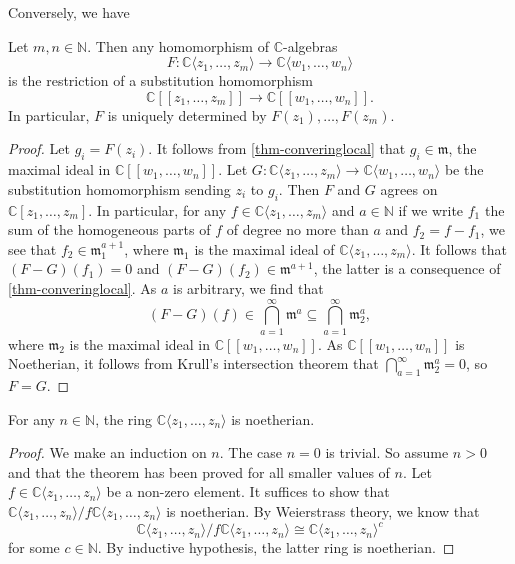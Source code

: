 Conversely, we have
\begin{lemma}\label{lma-homopowerringanalytic}
    Let $m,n\in \mathbb{N}$. Then any homomorphism of $\mathbb{C}$-algebras 
    \[
        F:  \mathbb{C}\langle z_1,\ldots,z_m\rangle\rightarrow  \mathbb{C}\langle w_1,\ldots,w_n\rangle
    \]
    is the restriction of a substitution homomorphism
    \[
        \mathbb{C}[[z_1,\ldots,z_m]]\rightarrow  \mathbb{C} [[ w_1,\ldots,w_n]].
    \]
    In particular, $F$ is uniquely determined by $F(z_1),\ldots,F(z_m)$.  
\end{lemma}
\begin{proof}
    Let $g_i=F(z_i)$. It follows from \cref{thm-converinglocal} that $g_i\in \mathfrak{m}$, the maximal ideal in $\mathbb{C} [[ w_1,\ldots,w_n]]$. Let $G:\mathbb{C}\langle z_1,\ldots,z_m\rangle\rightarrow  \mathbb{C}\langle w_1,\ldots,w_n\rangle$ be the substitution homomorphism sending $z_i$ to $g_i$. Then $F$ and $G$ agrees on $\mathbb{C}[z_1,\ldots,z_m]$. In particular, for any $f\in \mathbb{C}\langle z_1,\ldots,z_m\rangle$ and $a\in \mathbb{N}$ if we write $f_1$ the sum of the homogeneous parts of $f$ of degree no more than $a$ and $f_2=f-f_1$, we see that $f_2\in \mathfrak{m}_1^{a+1}$, where $\mathfrak{m}_1$ is the maximal ideal of $\mathbb{C}\langle z_1,\ldots,z_m\rangle$. It follows that $(F-G)(f_1)=0$ and $(F-G)(f_2)\in \mathfrak{m}^{a+1}$, the latter is a consequence of \cref{thm-converinglocal}.
    As $a$ is arbitrary, we find that
    \[
      (F-G)(f)\in \bigcap_{a=1}^{\infty}\mathfrak{m}^a\subseteq  \bigcap_{a=1}^{\infty}\mathfrak{m}_2^a,
    \]
    where $\mathfrak{m}_2$ is the maximal ideal in $\mathbb{C} [[ w_1,\ldots,w_n]]$.
    As $\mathbb{C}[[w_1,\ldots,w_n]] $ is Noetherian, it follows from Krull's intersection theorem \cite[\href{https://stacks.math.columbia.edu/tag/00IP}{Tag 00IP}]{stacks-project} that $\bigcap_{a=1}^{\infty}\mathfrak{m}_2^a=0$, so $F=G$.
\end{proof}


\begin{thm}\label{thm-localringnoetherian}
    For any $n\in \mathbb{N}$, the ring $\mathbb{C}\langle z_1,\ldots,z_n \rangle$ is noetherian.
\end{thm}
\begin{proof}
    We make an induction on $n$. The case $n=0$ is trivial. So assume $n>0$ and that the theorem has been proved for all smaller values of $n$. Let $f\in\mathbb{C}\langle z_1,\ldots,z_n \rangle$ be a non-zero element. It suffices to show that $\mathbb{C}\langle z_1,\ldots,z_n \rangle/f\mathbb{C}\langle z_1,\ldots,z_n \rangle$ is noetherian. By Weierstrass theory, we know that 
    \[
        \mathbb{C}\langle z_1,\ldots,z_n \rangle/f\mathbb{C}\langle z_1,\ldots,z_n \rangle\cong \mathbb{C}\langle z_1,\ldots,z_n \rangle^c
    \]
    for some $c\in \mathbb{N}$. By inductive hypothesis, the latter ring is noetherian.
\end{proof}



